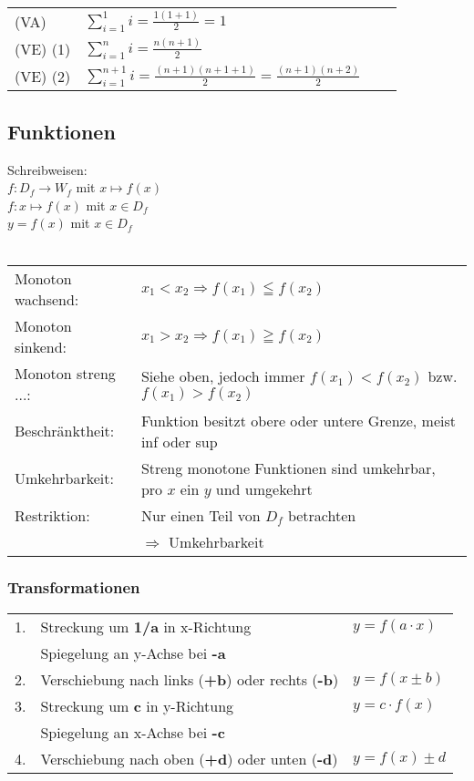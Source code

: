     \begin{tabular}{llll} 
        (VA) & $\sum \limits_{i=1}^1 i = \frac{1(1+1)}{2} = 1 $ \\
        (VE) (1) & $\sum \limits_{i=1}^n i = \frac{n(n+1)}{2}$  \\
        (VE) (2) & $\sum \limits_{i=1}^{n+1} i = \frac{(n+1)(n+1 + 1)}{2} = \frac{(n+1)(n+2)}{2} $  \\
    \end{tabular}

\subsection{Funktionen}

Schreibweisen: \\
$f:D_f \rightarrow W_f$ mit $x \mapsto f(x)$\\
$f:x \mapsto f(x)$ mit $x \in D_f$\\
$y=f(x)$ mit $x \in D_f$		 \\	
\\
\begin{tabular}{ll}
    Monoton wachsend:   & $x_1 < x_2 \Rightarrow f(x_1) \leqq f(x_2)$ \\
    Monoton sinkend:    & $x_1 > x_2 \Rightarrow f(x_1) \geqq f(x_2)$ \\
    Monoton streng ...: & Siehe oben, jedoch immer $f(x_1) < f(x_2)$ bzw. $f(x_1) > f(x_2)$ \\
    Beschränktheit:     & Funktion besitzt obere oder untere Grenze, meist inf oder sup \\
    Umkehrbarkeit:      & Streng monotone Funktionen sind umkehrbar, pro $x$ ein $y$ und umgekehrt \\
    Restriktion:        & Nur einen Teil von $D_f$ betrachten \\ 
                        & $\Rightarrow$ Umkehrbarkeit \\
\end{tabular}
                
\subsubsection{Transformationen}	
    \begin{tabular}{lll}
        1. & Streckung um \textbf{1/a} in x-Richtung & $y = f(a \cdot x)$ \\
           & Spiegelung an y-Achse bei \textbf{-a} & \\
        2. & Verschiebung nach links (\textbf{+b}) oder rechts  (\textbf{-b}) & $y = f(x \pm b)$\\
        3. & Streckung um \textbf{c} in y-Richtung & $y = c \cdot f(x)$ \\
           & Spiegelung an x-Achse bei \textbf{-c} & \\
        4. & Verschiebung nach oben (\textbf{+d}) oder unten (\textbf{-d}) & $y = f(x) \pm d $ \\
    \end{tabular}
    
